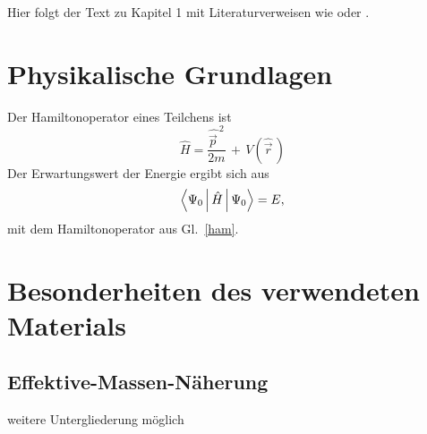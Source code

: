 Hier folgt der Text zu Kapitel 1 mit Literaturverweisen wie \cite{Jackson1999,Einstein1925} oder
\cite{HaugKoch2004,Meinke2005,Holm1998}.

\section{Physikalische Grundlagen}
Der Hamiltonoperator eines Teilchens ist \cite{Nolting2007}
\begin{equation}\label{ham}
\hat{H}=\frac{\hat{\vec{p}\,}^2}{2m}\,+\,V(\hat{\vec{r}}\,)
\end{equation}
Der Erwartungswert der Energie ergibt sich aus 
\begin{align}
  \label{gl-erwartungswert}
  \Braket{\Psi_0|\hat H|\Psi_0} = E,
\end{align}
mit dem Hamiltonoperator aus Gl.\ \eqref{ham}.


\section{Besonderheiten des verwendeten Materials}

\subsection{Effektive-Massen-Näherung}
weitere Untergliederung m\"oglich
